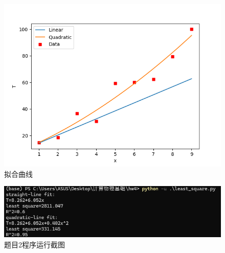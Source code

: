 \documentclass[11pt]{article}
\begin{document}
  \begin{figure}[ht]
    \centering
    \includegraphics[width=0.8\linewidth]{photo/least_square.png}
    \caption{拟合曲线}
    \label{fig:4}
  \end{figure}



  \begin{figure}
    \centering
    \includegraphics[width=0.6\linewidth]{photo/fig2.png}
    \caption{题目2程序运行截图}
    \label{fig:5}
  \end{figure}

  
\end{document}
